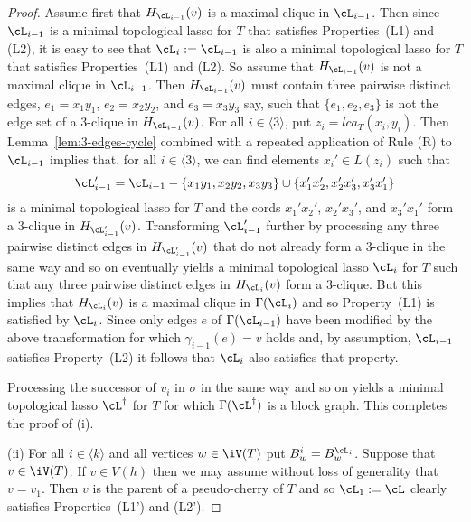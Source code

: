 \begin{proof}
  Assume first that $H_{\cL_{i-1}}(v)$ is a maximal clique in
  $\cL_{i-1}$. Then since $\cL_{i-1}$ is a minimal topological lasso for $T$
  that satisfies Properties~(L1) and (L2), it is easy to see that
  $\cL_{i}:=\cL_{i-1}$ is also a minimal topological lasso for $T$ that
  satisfies Properties~(L1) and (L2).  So assume that $H_{\cL_{i-1}}(v)$ is
  not a maximal clique in $\cL_{i-1}$.  Then $H_{\cL_{i-1}}(v)$ must contain
  three pairwise distinct edges, $e_1=x_1y_1$, $e_2=x_2y_2$, and $e_3=x_3y_3$
  say, such that $\{e_1, e_2,e_3\}$ is not the edge set of a $3$-clique in
  $H_{\cL_{i-1}}(v)$.
  For all $i\in\langle 3\rangle $, put $z_i=lca_T(x_i,y_i)$.  Then
  Lemma~\ref{lem:3-edges-cycle} combined with a repeated application of Rule
  (R) to $\cL_{i-1}$ implies that, for all $i\in\langle 3\rangle$, we can find
  elements $x_i'\in L(z_i)$ such that
$$
\cL_{i-1}'=\cL_{i-1}-\{x_1y_1,x_2y_2,x_3y_3\}\cup 
\{x_1'x_2', x_2'x_3',x_3'x_1'\}
$$
is a minimal topological lasso for $T$ and the cords $x_1'x_2'$, $x_2'x_3'$,
and $x_3'x_1'$ form a $3$-clique in $H_{\cL_{i-1}'}(v)$.  Transforming
$\cL_{i-1}'$ further by processing any three pairwise distinct edges in
$H_{\cL_{i-1}'}(v)$ that do not already form a $3$-clique in the same way and
so on eventually yields a minimal topological lasso $\cL_{i}$ for $T$ such
that any three pairwise distinct edges in $H_{\cL_{i}}(v)$ form a
$3$-clique. But this implies that $H_{\cL_{i}}(v)$ is a maximal clique in
$\Gamma(\cL_{i})$
and so Property~(L1) is satisfied by $\cL_i$. Since only edges $e$ of
$\Gamma(\cL_{i-1})$ have been modified by the above transformation for which
$\gamma_{i-1}(e)=v$ holds and, by assumption, $\cL_{i-1}$ satisfies
Property~(L2) it follows that $\cL_{i}$ also satisfies that property.

Processing the successor of $v_i$ in $\sigma$ in the same way and so on yields
a minimal topological lasso $\cL^{\dagger}$ for $T$ for which
$\Gamma(\cL^{\dagger})$ is a block graph. This completes the proof of (i).


(ii) For all $i\in \langle k\rangle$ and all vertices $w\in \iV(T)$ put
$B^i_w=B^{\cL_i}_w$.  Suppose that $v\in \iV(T)$. If $v\in V(h)$ then
we may assume without loss of generality that $v=v_1$. Then $v$ is the parent
of a pseudo-cherry of $T$ and so $\cL_1:=\cL$ clearly satisfies
Properties~(L1') and (L2').


\end{proof}
